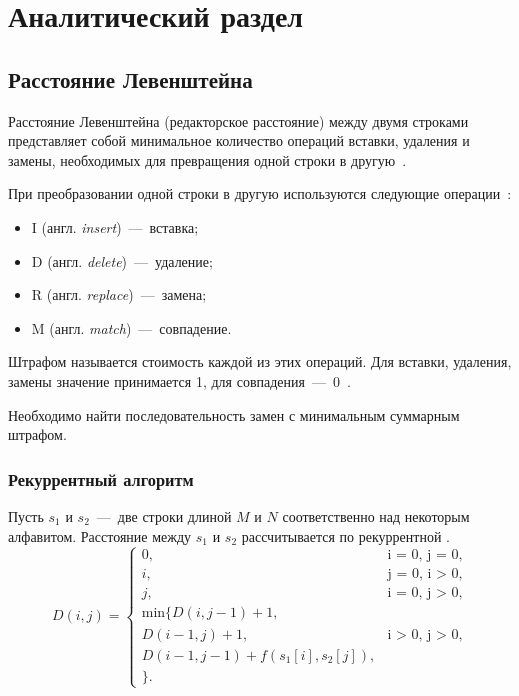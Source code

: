 \chapter{Аналитический раздел}
\section{Расстояние Левенштейна}
Расстояние Левенштейна (редакторское расстояние) между двумя строками представляет собой минимальное количество операций вставки, удаления и замены, необходимых для превращения одной строки в другую~\cite{levenstein}.

При преобразовании одной строки в другую используются следующие операции~\cite{levenstein}:

\begin{itemize}
	\item I (англ. \textit{insert})~---~вставка;
	\item D (англ. \textit{delete})~---~удаление;
	\item R (англ. \textit{replace})~---~замена;
	\item M (англ. \textit{match})~---~совпадение.
\end{itemize}

Штрафом называется стоимость каждой из этих операций. Для вставки, удаления, замены значение принимается 1, для совпадения~---~0~\cite{levenstein}.  

Необходимо найти последовательность замен с минимальным суммарным штрафом.

\subsection{Рекуррентный алгоритм}
Пусть $s_{1}$ и $s_{2}$~---~две строки длиной $M$ и $N$ соответственно над некоторым алфавитом. Расстояние между $s_{1}$ и $s_{2}$ рассчитывается по рекуррентной .
\begin{equation}
	\label{eq:leven_recur}
	D(i, j) =
	\begin{cases}
		0, &\text{i = 0, j = 0,}\\
		i, &\text{j = 0, i > 0,}\\
		j, &\text{i = 0, j > 0,}\\
		\text{min}  \lbrace
		D(i, j - 1) + 1,\\
		D(i - 1, j) + 1, &\text{i > 0, j > 0,}\\
		D(i - 1, j - 1) +  f(s_{1}[i], s_{2}[j]), \\
		\rbrace.
		
	\end{cases}
\end{equation}

